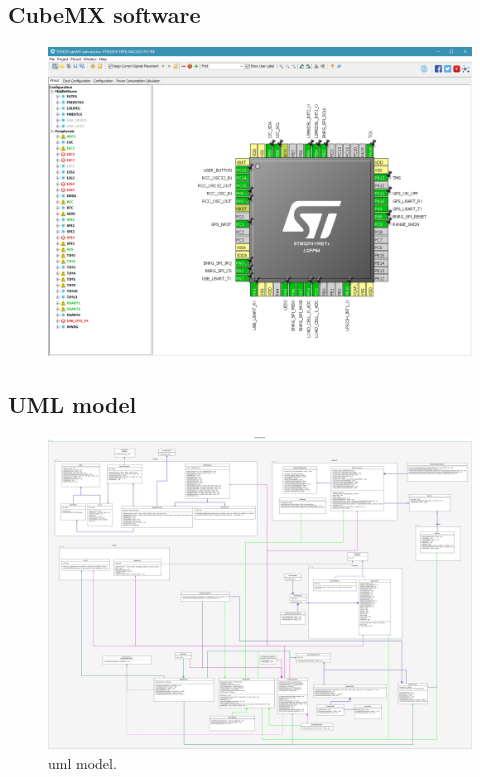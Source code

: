 \subsection{CubeMX software}\label{sec:app:mxc}
\begin{figure}[tbh]
	\centering
    	\includegraphics[width=\linewidth]{Figures/MXCube.png}
	\label{fig:mxc}
\end{figure}

\clearpage
\subsection{UML model}
\begin{figure}[H]%
	\centering
	\includegraphics[height =\linewidth, angle = 90]{Figures/uml.png}
	\caption{\gls{uml} model.}
	\label{android-uml}
\end{figure}

